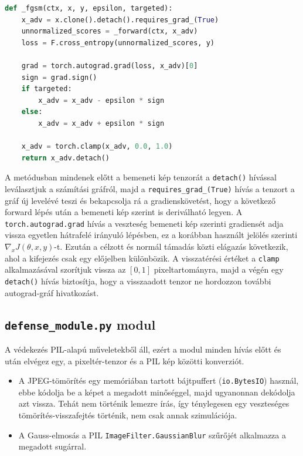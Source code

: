 \begin{lstlisting}[language=Python, caption={Az FGSM implementációja (\texttt{attack\_engine.\_fgsm})}, label={lst:fgsm}]
def _fgsm(ctx, x, y, epsilon, targeted):
    x_adv = x.clone().detach().requires_grad_(True)
    unnormalized_scores = _forward(ctx, x_adv)
    loss = F.cross_entropy(unnormalized_scores, y)

    grad = torch.autograd.grad(loss, x_adv)[0]
    sign = grad.sign()
    if targeted:
        x_adv = x_adv - epsilon * sign
    else:
        x_adv = x_adv + epsilon * sign

    x_adv = torch.clamp(x_adv, 0.0, 1.0)
    return x_adv.detach()
\end{lstlisting}

A metódusban mindenek előtt a bemeneti kép tenzorát a \texttt{detach()} hívással leválasztjuk a számítási gráfról, majd a 
\texttt{requires\_grad\_(True)} hívás a tenzort a gráf új levelévé teszi és bekapcsolja rá a gradienskövetést, hogy a következő 
forward lépés után a bemeneti kép szerint is deriválható legyen. 
A \texttt{torch.autograd.grad} hívás a veszteség bemeneti kép szerinti gradiensét adja vissza egyetlen hátrafelé irányuló 
lépésben, ez a korábban használt jelölés szerinti $\nabla_x J(\theta, x, y)$-t. 
Ezután a célzott és normál támadás közti elágazás következik, ahol a kifejezés csak egy előjelben különbözik. 
A visszatérési értéket a \texttt{clamp} alkalmazásával szorítjuk vissza az $[0, 1]$ pixeltartományra, majd a végén egy 
\texttt{detach()} hívás biztosítja, hogy a visszaadott tenzor ne hordozzon további autograd-gráf hivatkozást. 

\subsection{\texttt{defense\_module.py} modul}
A védekezés PIL-alapú műveletekből áll, ezért a modul minden hívás előtt és után elvégez egy, a pixeltér-tenzor és a PIL kép 
közötti konverziót. 
\begin{itemize}
  \item A JPEG-tömörítés egy memóriában tartott bájtpuffert (\texttt{io.BytesIO}) használ, ebbe kódolja be a képet a megadott 
        minőséggel, majd ugyanonnan dekódolja azt vissza. 
        Tehát nem történik lemezre írás, így ténylegesen egy veszteséges tömörítés-visszafejtés történik, nem csak annak 
        szimulációja. 
  \item A Gauss-elmosás a PIL \texttt{ImageFilter.GaussianBlur} szűrőjét alkalmazza a megadott sugárral. 
\end{itemize}

